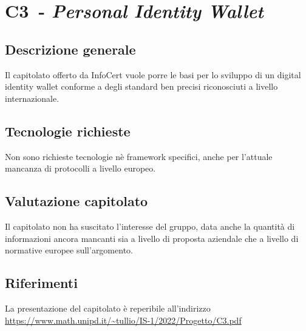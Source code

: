 
\renewcommand{\capName}{\textit{Personal Identity Wallet}} %
\renewcommand{\capCode}{C3} %
\renewcommand{\capLink}{https://www.math.unipd.it/~tullio/IS-1/2022/Progetto/C3.pdf} %
\renewcommand{\capProposer}{InfoCert} %


\section{\capCode\ - \capName} 
\subsection{Descrizione generale}
Il capitolato offerto da InfoCert vuole porre le basi per lo sviluppo di un digital identity wallet conforme a degli standard ben precisi riconosciuti a livello internazionale.

\subsection{Tecnologie richieste}
Non sono richieste tecnologie nè framework specifici, anche per l'attuale mancanza di protocolli a livello europeo.

\subsection{Valutazione capitolato}
Il capitolato non ha suscitato l'interesse del gruppo, data anche la quantità di informazioni ancora mancanti sia a livello di proposta aziendale che a livello di normative europee sull'argomento.

\subsection{Riferimenti}
La presentazione del capitolato è reperibile all'indirizzo \url{\capLink}